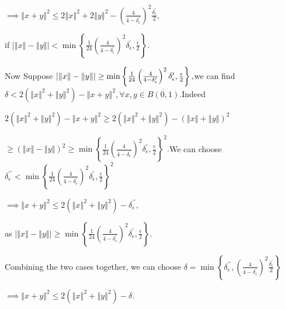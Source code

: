 \documentclass{article}
\begin{document}
$\implies \left\Vert x+y\right\Vert ^{2}\leq 2\left\Vert x\right\Vert
^{2}+2\left\Vert y\right\Vert ^{2}-\left( \frac{4}{4-\delta _{\epsilon
}^{\prime }}\right) ^{2}\frac{\delta _{\epsilon }^{\prime }}{2},$

if  $\left\vert \left\Vert x\right\Vert -\left\Vert y\right\Vert \right\vert
<\min \left\{ \frac{1}{24}\left( \frac{4}{4-\delta _{\epsilon }^{\prime }}%
\right) ^{2}\delta _{\epsilon }^{\prime },\frac{\epsilon }{2}\right\} .$

Now Suppose $\left\vert \left\Vert x\right\Vert -\left\Vert y\right\Vert
\right\vert \geq \min \left\{ \frac{1}{24}\left( \frac{4}{4-\delta
_{\epsilon }^{\prime }}\right) ^{2}\delta _{\epsilon }^{\prime },\frac{%
\epsilon }{2}\right\} ,$we can find $\delta <2\left( \left\Vert x\right\Vert
^{2}+\left\Vert y\right\Vert ^{2}\right) -\left\Vert x+y\right\Vert
^{2},\forall x,y\in \overline{B\left( 0,1\right) }.$Indeed 

$2\left( \left\Vert x\right\Vert ^{2}+\left\Vert y\right\Vert ^{2}\right)
-\left\Vert x+y\right\Vert ^{2}\geq 2\left( \left\Vert x\right\Vert
^{2}+\left\Vert y\right\Vert ^{2}\right) -\left( \left\Vert x\right\Vert
+\left\Vert y\right\Vert \right) ^{2}$

$\geq \left( \left\Vert x\right\Vert -\left\Vert y\right\Vert \right)
^{2}\geq \min \left\{ \frac{1}{24}\left( \frac{4}{4-\delta _{\epsilon
}^{\prime }}\right) ^{2}\delta _{\epsilon }^{\prime },\frac{\epsilon }{2}%
\right\} ^{2}.$We can choose $\delta _{\epsilon }^{\prime \prime }<\min
\left\{ \frac{1}{24}\left( \frac{4}{4-\delta _{\epsilon }^{\prime }}\right)
^{2}\delta _{\epsilon }^{\prime },\frac{\epsilon }{2}\right\} ^{2}$

$\implies \left\Vert x+y\right\Vert ^{2}\leq 2\left( \left\Vert x\right\Vert
^{2}+\left\Vert y\right\Vert ^{2}\right) -\delta _{\epsilon }^{\prime \prime
},$ 

as $\left\vert \left\Vert x\right\Vert -\left\Vert y\right\Vert \right\vert
\geq \min \left\{ \frac{1}{24}\left( \frac{4}{4-\delta _{\epsilon }^{\prime }%
}\right) ^{2}\delta _{\epsilon }^{\prime },\frac{\epsilon }{2}\right\} .$

Combining the two cases together, we can choose $\delta =\min \left\{ \delta
_{\epsilon }^{\prime \prime },\left( \frac{4}{4-\delta _{\epsilon }^{\prime }%
}\right) ^{2}\frac{\delta _{\epsilon }^{\prime }}{2}\right\} $

$\implies \left\Vert x+y\right\Vert ^{2}\leq 2\left( \left\Vert x\right\Vert
^{2}+\left\Vert y\right\Vert ^{2}\right) -\delta .$
\end{document}
